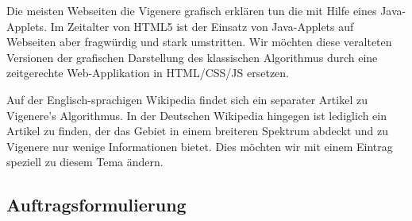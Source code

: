 \documentclass[11pt,paper=a4,final]{scrartcl}
\begin{document}
Die meisten Webseiten die Vigenere grafisch erkl\"aren tun die mit Hilfe eines
Java-Applets. Im Zeitalter von HTML5 ist der Einsatz von Java-Applets auf
Webseiten aber fragw\"urdig und stark umstritten. Wir m\"ochten diese veralteten
Versionen der grafischen Darstellung des klassischen Algorithmus durch eine
zeitgerechte Web-Applikation in HTML/CSS/JS ersetzen.

Auf der Englisch-sprachigen Wikipedia findet sich ein separater Artikel zu
Vigenere's Algorithmus. In der Deutschen Wikipedia hingegen ist lediglich ein
Artikel zu finden, der das Gebiet in einem breiteren Spektrum abdeckt und zu
Vigenere nur wenige Informationen bietet. Dies m\"ochten wir mit einem Eintrag
speziell zu diesem Tema \"andern.
\subsection{Auftragsformulierung}
\end{document}
